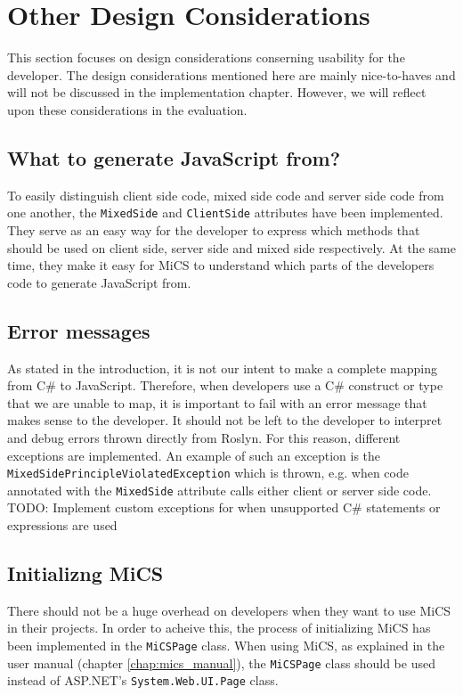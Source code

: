 \section{Other Design Considerations}
This section focuses on design considerations conserning usability for the developer. The design considerations mentioned here are mainly nice-to-haves and will not be discussed in the implementation chapter. However, we will reflect upon these considerations in the evaluation.

\subsection{What to generate JavaScript from?} %
\label{sub:what_to_generate_javascript_from}
	To easily distinguish client side code, mixed side code and server side code from one another, the \texttt{MixedSide} and \texttt{ClientSide} attributes have been implemented. They serve as an easy way for the developer to express which methods that should be used on client side, server side and mixed side respectively. At the same time, they make it easy for MiCS to understand which parts of the developers code to generate JavaScript from.


\subsection{Error messages} %
\label{sub:design_error_messages}
	As stated in the introduction, it is not our intent to make a complete mapping from C\# to JavaScript. Therefore, when developers use a C\# construct or type that we are unable to map, it is important to fail with an error message that makes sense to the developer. It should not be left to the developer to interpret and debug errors thrown directly from Roslyn. For this reason, different exceptions are implemented. An example of such an exception is the \texttt{MixedSidePrincipleViolatedException} which is thrown, e.g. when code annotated with the \texttt{MixedSide} attribute calls either client or server side code.
	TODO: Implement custom exceptions for when unsupported C\# statements or expressions are used


\subsection{Initializng MiCS} %
\label{sub:initializng_mics}
	There should not be a huge overhead on developers when they want to use MiCS in their projects. In order to acheive this, the process of initializing MiCS has been implemented in the \texttt{MiCSPage} class. When using MiCS, as explained in the user manual (chapter \ref{chap:mics_manual}), the \texttt{MiCSPage} class should be used instead of ASP.NET's \texttt{System.Web.UI.Page} class.
